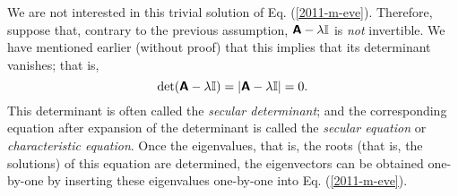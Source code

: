 We are not interested in this trivial solution of Eq. (\ref{2011-m-eve}).
Therefore, suppose that, contrary to the previous assumption,
$\textsf{\textbf{A}} - \lambda {\Bbb I}$ is {\em not} invertible.
We have mentioned earlier (without proof) that this implies that its determinant vanishes; that is,
\begin{equation}
\textrm{det} (\textsf{\textbf{A}} - \lambda {\Bbb I}) = \vert \textsf{\textbf{A}} - \lambda {\Bbb I}\vert =0.
\label{2014-m-eve-ce}
\end{equation}
This determinant is often called the {\em secular determinant};
and the corresponding equation after expansion of the determinant is called the
{\em secular equation}
or {\em characteristic equation}.
Once the eigenvalues, that is, the roots (that is, the solutions) of this equation are determined,
the eigenvectors can be obtained one-by-one by inserting these eigenvalues one-by-one into Eq. (\ref{2011-m-eve}).


